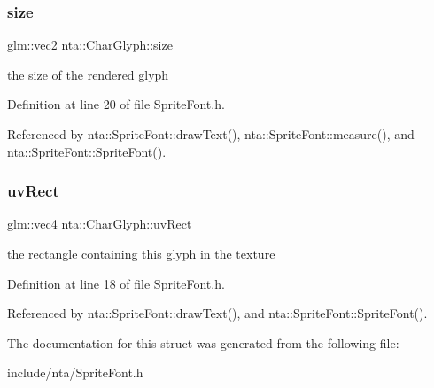 \subsubsection{\texorpdfstring{size}{size}}
{\footnotesize\ttfamily glm\+::vec2 nta\+::\+Char\+Glyph\+::size}



the size of the rendered glyph 



Definition at line 20 of file Sprite\+Font.\+h.



Referenced by nta\+::\+Sprite\+Font\+::draw\+Text(), nta\+::\+Sprite\+Font\+::measure(), and nta\+::\+Sprite\+Font\+::\+Sprite\+Font().

\mbox{\label{structnta_1_1CharGlyph_a46d9ea9c38c8bf5e1c1679e938019f53}} 
\subsubsection{\texorpdfstring{uv\+Rect}{uvRect}}
{\footnotesize\ttfamily glm\+::vec4 nta\+::\+Char\+Glyph\+::uv\+Rect}



the rectangle containing this glyph in the texture 



Definition at line 18 of file Sprite\+Font.\+h.



Referenced by nta\+::\+Sprite\+Font\+::draw\+Text(), and nta\+::\+Sprite\+Font\+::\+Sprite\+Font().



The documentation for this struct was generated from the following file\+:\begin{DoxyCompactItemize}
\item 
include/nta/Sprite\+Font.\+h\end{DoxyCompactItemize}
